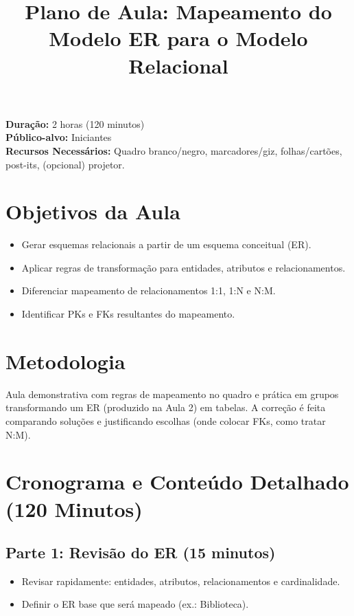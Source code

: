 \documentclass[12pt,a4paper]{article}
\title{Plano de Aula: Mapeamento do Modelo ER para o Modelo Relacional}
\date{}
\begin{document}
\maketitle

\noindent
\textbf{Duração:} 2 horas (120 minutos)\\
\textbf{Público-alvo:} Iniciantes\\
\textbf{Recursos Necessários:} Quadro branco/negro, marcadores/giz, folhas/cartões, post-its, (opcional) projetor.

\section{Objetivos da Aula}
\begin{itemize}[leftmargin=*,itemsep=0.25em]
  \item Gerar esquemas relacionais a partir de um esquema conceitual (ER).
  \item Aplicar regras de transformação para entidades, atributos e relacionamentos.
  \item Diferenciar mapeamento de relacionamentos 1:1, 1:N e N:M.
  \item Identificar PKs e FKs resultantes do mapeamento.
\end{itemize}

\section{Metodologia}
Aula demonstrativa com regras de mapeamento no quadro e prática em grupos transformando um ER (produzido na Aula 2) em tabelas. A correção é feita comparando soluções e justificando escolhas (onde colocar FKs, como tratar N:M).

\section{Cronograma e Conteúdo Detalhado (120 Minutos)}
\subsection*{Parte 1: Revisão do ER (15 minutos)}
\begin{itemize}[leftmargin=*,itemsep=0.35em]
  \item Revisar rapidamente: entidades, atributos, relacionamentos e cardinalidade.
  \item Definir o ER base que será mapeado (ex.: Biblioteca).
\end{itemize}
\end{document}
